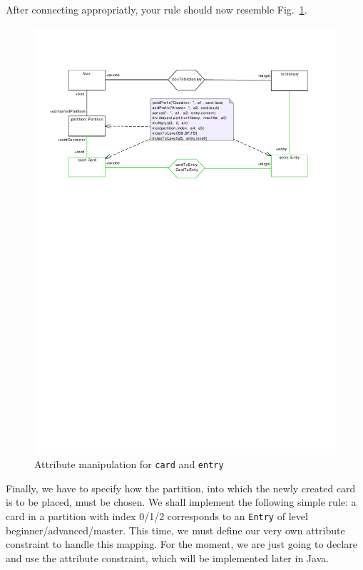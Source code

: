 After connecting appropriatly, your rule should now resemble Fig.~\ref{fig:cardtoentry_2}.

\begin{figure}[htbp]
\begin{center}
  \includegraphics[width=\textwidth]{pics/tggBilder/tggRule/tgg20}
  \caption{Attribute manipulation for \texttt{card} and \texttt{entry}}  
  \label{fig:cardtoentry_2}
\end{center}
\end{figure}

Finally, we have to specify how the partition, into which the newly created card is to be placed, must be chosen.
We shall implement the following simple rule: a card in a partition with index 0/1/2 corresponds to an \texttt{Entry} of level beginner/advanced/master.
This time, we must define our very own attribute constraint to handle this mapping.
For the moment, we are just going to declare and use the attribute constraint, which will be implemented later in Java.

